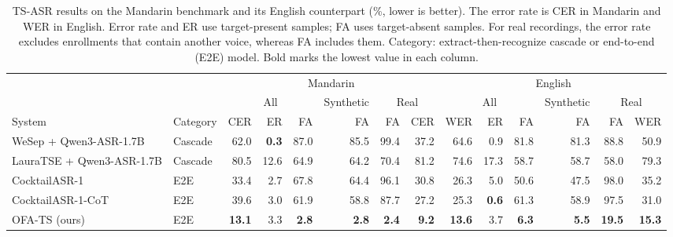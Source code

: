 \begin{table}[t]
\caption{TS-ASR results on the Mandarin benchmark and its English counterpart (\%, lower is better). The error rate is CER in Mandarin and WER in English. Error rate and ER use target-present samples; FA uses target-absent samples. For real recordings, the error rate excludes enrollments that contain another voice, whereas FA includes them. Category: extract-then-recognize cascade or end-to-end (E2E) model. Bold marks the lowest value in each column.}
\label{tab:overall}
\centering
\small
\setlength{\tabcolsep}{3.8pt}
\begin{tabular}{@{}llrrrrrrrrrrrr@{}}
\toprule
 & & \multicolumn{6}{c}{Mandarin} & \multicolumn{6}{c}{English} \\
\cmidrule(lr){3-8}\cmidrule(l){9-14}
 & & \multicolumn{3}{c}{All} & Synthetic & \multicolumn{2}{c}{Real} & \multicolumn{3}{c}{All} & Synthetic & \multicolumn{2}{c}{Real} \\
\cmidrule(lr){3-5}\cmidrule(lr){6-6}\cmidrule(lr){7-8}\cmidrule(lr){9-11}\cmidrule(lr){12-12}\cmidrule(l){13-14}
System & Category & CER & ER & FA & FA & FA & CER & WER & ER & FA & FA & FA & WER \\
\midrule
WeSep + Qwen3-ASR-1.7B & Cascade & 62.0 & \textbf{0.3} & 87.0 & 85.5 & 99.4 & 37.2 & 64.6 & 0.9 & 81.8 & 81.3 & 88.8 & 50.9 \\
LauraTSE + Qwen3-ASR-1.7B & Cascade & 80.5 & 12.6 & 64.9 & 64.2 & 70.4 & 81.2 & 74.6 & 17.3 & 58.7 & 58.7 & 58.0 & 79.3 \\
\midrule
CocktailASR-1 & E2E & 33.4 & 2.7 & 67.8 & 64.4 & 96.1 & 30.8 & 26.3 & 5.0 & 50.6 & 47.5 & 98.0 & 35.2 \\
CocktailASR-1-CoT & E2E & 39.6 & 3.0 & 61.9 & 58.8 & 87.7 & 27.2 & 25.3 & \textbf{0.6} & 61.3 & 58.9 & 97.5 & 31.0 \\
OFA-TS (ours) & E2E & \textbf{13.1} & 3.3 & \textbf{2.8} & \textbf{2.8} & \textbf{2.4} & \textbf{9.2} & \textbf{13.6} & 3.7 & \textbf{6.3} & \textbf{5.5} & \textbf{19.5} & \textbf{15.3} \\
\bottomrule
\end{tabular}
\end{table}

